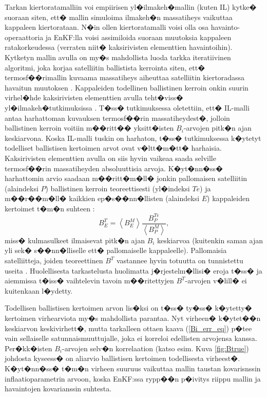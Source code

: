 \documentclass[12pt,a4paper,finnish,margin=2in]{article}
\begin{document}
Tarkan kiertoratamalliin voi empiirisen yl�ilmakeh�mallin (kuten IL) kytke� suoraan siten, ett� mallin simuloima ilmakeh�n massatiheys vaikuttaa kappaleen kiertorataan. N�in ollen kiertoratamalli voisi olla osa havainto-operaattoria ja EnKF:lla voisi assimiloida suoraan muutoksia kappaleen ratakorkeudessa (verraten niit� kaksirivisten elementtien havaintoihin). Kytketyn mallin avulla on my�s mahdollista luoda tarkka iteratiivinen algoritmi, joka korjaa satelliitin ballistista kerrointa siten, ett� termosf��rimallin kuvaama massatiheys aiheuttaa satelliitin kiertoradassa havaitun muutoksen \citep{saunders_2011}. Kappaleiden todellinen ballistinen kerroin onkin suurin virhel�hde kaksirivisten elementtien avulla teht�viss� yl�ilmakeh�tutkimuksissa \citep{bowman_2002}. T�ss� tutkimuksessa oletettiin, ett� IL-malli antaa harhattoman kuvauksen termosf��rin massatiheydest�, jolloin ballistinen kerroin voitiin m��ritt�� yksitt�isten $B_i$-arvojen pitk�n ajan keskiarvona. Koska IL-malli tuskin on harhaton, t�ss� tutkimuksessa k�ytetyt todelliset ballistisen kertoimen arvot ovat v�ltt�m�tt� harhaisia. Kaksirivisten elementtien avulla on siis hyvin vaikeaa saada selville termosf��rin massatiheyden absoluuttisia arvoja. K�yt�nn�ss� harhattomin arvio saadaan m��ritt�m�ll� jonkin pallomaisen satelliitin (alaindeksi $P$) ballistinen kerroin teoreettisesti (yl�indeksi $Te$) ja m��r��m�ll� kaikkien ep�s��nn�llisten (alaindeksi $E$) kappaleiden kertoimet t�m�n suhteen \citep{picone_2005}: 
\begin{equation} \label{Bspherical_eq}
B^T_E = \left \langle B_E^M \right \rangle \frac{B_P^{Te}}{\left \langle B_P^M \right \rangle},
\end{equation}
miss� kulmasulkeet ilmaisevat pitk�n ajan $B_i$ keskiarvoa (kuitenkin saman ajan yli sek� s��nn�lliselle ett� pallomaiselle kappaleelle). Pallomaisia satelliitteja, joiden teoreettinen $B^T$ vastannee hyvin totuutta on tunnistettu useita \citep{bowman_2002,doornbos_2004}. Huolellisesta tarkastelusta huolimatta j�rjestelm�llisi� eroja t�ss� ja aiemmissa t�iss� vaihtelevin tavoin m��ritettyjen $B^T$-arvojen v�lill� ei kuitenkaan l�ydetty. 

Todellisen ballistisen kertoimen arvon lis�ksi on t�ss� ty�ss� k�ytetty� kertoimen virhearviota my�s mahdollista parantaa. Nyt virheen� k�ytet��n keskiarvon keskivirhett�, mutta tarkalleen ottaen kaava (\ref{Bi_err_eq}) p�tee vain sellaiselle satunnaismuuttujalle, joka ei korreloi edellisten arvojensa kanssa. Per�kk�isten $B_i$-arvojen selv�n korrelaation (katso esim. Kuva \ref{fig:Btrue}) johdosta kyseess� on aliarvio ballistisen kertoimen todellisesta virheest�. K�yt�nn�ss� t�m�n virheen suuruus vaikuttaa mallin taustan kovarisnssin inflaatioparametrin arvoon, koska EnKF:ssa rypp��n p�ivitys riippu mallin ja havaintojen kovarianssin suhtesta. 
\end{document}
